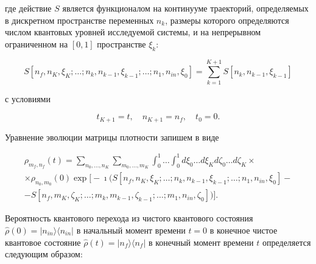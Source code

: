 где действие $S$ является функционалом на континууме траекторий, определяемых в дискретном пространстве переменных $n_k$, размеры которого определяются числом квантовых уровней исследуемой системы, и на непрерывном ограниченном на $[0, 1]$ пространстве $\xi_k$:

\begin{equation}

\label{biruk:31}

S[n_f,n_{K},\xi_K;\dots ;n_k,n_{k-1},\xi_{k-1};\dots ;n_{1},n_{in},\xi_0]=\sum\limits_{k=1}^{K+1}S[n_k,n_{k-1},\xi_{k-1}] 

\end{equation}

с условиями

$$t_{K+1}=t,\quad n_{K+1}=n_f,\quad t_{0}=0.$$



Уравнение эволюции матрицы плотности запишем в виде

\begin{multline}

\label{biruk:32}

\rho_{m_f,n_f}(t)=

\sum\limits_{n_{0},\dots,n_{K}}\sum\limits_{m_{0},\dots,m_{K}} \int _{0}^{1} \dots

\int _{0}^{1} d\xi_0\dots d\xi_Kd\zeta_0\dots d\zeta_K 

\times

\\

\times

\rho_{n_{0},m_{0}}(0)

\exp\bigl[-\imath \bigl(S[n_f,n_{K},\xi_K;\dots ;n_k,n_{k-1},\xi_{k-1};\dots ;n_{1},n_{in},\xi_0]

-

\\

-

S[n_f,m_{K},\zeta_K;\dots ;m_k,m_{k-1},\zeta_{k-1};\dots ;m_{1},n_{in},\zeta_0]\bigr)\bigr]. 

\end{multline}



Вероятность квантового перехода из чистого квантового состояния $\hat{\rho}(0)=| n_{in} \rangle \langle n_{in}|$ в начальный момент времени $t=0$ в конечное чистое квантовое состояние $\hat{\rho}(t)=|n_{f}\rangle \langle n_{f}|$ в конечный момент времени $t$ определяется следующим образом:

